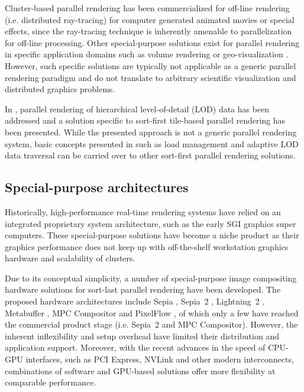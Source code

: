 Cluster-based parallel rendering has been commercialized for off-line rendering
(i.e. distributed ray-tracing) for computer generated animated movies or special
effects, since the ray-tracing technique is inherently amenable to
parallelization for off-line processing. Other special-purpose solutions exist
for parallel rendering in specific application domains such as volume rendering
\cite{LWMT:97,Wittenbrink:98,HSCSM:00,SL:02,GS:02,NSJLYZ:05} or
geo-visualization \cite{VR:91,AG:95,LDC:96,JLMV:06}. However, such specific
solutions are typically not applicable as a generic parallel rendering paradigm
and do not translate to arbitrary scientific visualization and distributed
graphics problems.

In \cite{NC:07}, parallel rendering of hierarchical level-of-detail (LOD) data
has been addressed and a solution specific to sort-first tile-based parallel
rendering has been presented. While the presented approach is not a generic
parallel rendering system, basic concepts presented in \cite{NC:07} such as load
management and adaptive LOD data traversal can be carried over to other
sort-first parallel rendering solutions.

\subsection{Special-purpose architectures}

Historically, high-performance real-time rendering systems have relied on an
integrated proprietary system architecture, such as the early SGI graphics super
computers. These special-purpose solutions have become a niche product as their
graphics performance does not keep up with off-the-shelf workstation graphics
hardware and scalability of clusters.

Due to its conceptual simplicity, a number of special-purpose image compositing
hardware solutions for sort-last parallel rendering have been developed. The
proposed hardware architectures include Sepia \cite {MHS:99a,sepia}, Sepia~2
\cite{LMSBHa:01,LMSBH:01}, Lightning~2 \cite{Stoll01}, Metabuffer
\cite{Blanke00,Zhang01}, MPC Compositor \cite{Muraki01} and PixelFlow
\cite{Molnar92,Eyles97}, of which only a few have reached the commercial
product stage (i.e. Sepia~2 and MPC Compositor). However, the inherent
inflexibility and setup overhead have limited their distribution and application
support. Moreover, with the recent advances in the speed of CPU-GPU interfaces,
such as PCI Express, NVLink and other modern interconnects, combinations of
software and GPU-based solutions offer more flexibility at comparable
performance.

